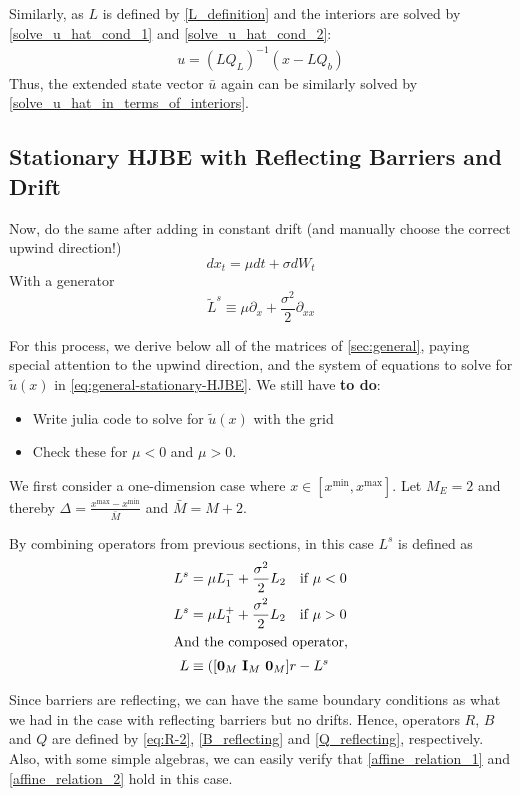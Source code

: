 \documentclass[11pt]{article}
\newcommand{\D}[1][]{\ensuremath{\partial_{#1}}}
\begin{document}
Similarly, as $L$ is defined by \cref{L_definition} and the interiors are solved by \cref{solve_u_hat_cond_1} and \cref{solve_u_hat_cond_2}:
\begin{align}
u = (L Q_L)^{-1}(x-L Q_b)
\end{align}
Thus, the extended state vector $\bar{u}$ again can be similarly solved by \cref{solve_u_hat_in_terms_of_interiors}.

\subsection{Stationary HJBE with Reflecting Barriers and Drift}
Now, do the same after adding in constant drift (and manually choose the correct upwind direction!)
$$
d x_t = \mu dt + \sigma d W_t
$$
With a generator
$$
	\tilde{L}^s \equiv \mu \D[x] + \frac{\sigma^2}{2}\D[xx]
$$

For this process, we derive below all of the matrices of \cref{sec:general}, paying special attention to the upwind direction, and the system of equations to solve for $\tilde{u}(x)$ in \cref{eq:general-stationary-HJBE}. We still have \textbf{to do}:
\begin{itemize}
	\item Write julia code to solve for $\tilde{u}(x)$ with the grid
	\item Check these for $\mu < 0$ and $\mu > 0$.
\end{itemize}

We first consider a one-dimension case where $x\in [x^{\min},x^{\max}]$. Let $M_E = 2$ and thereby $\Delta  = \frac{x^{\max}-x^{\min}}{\bar{M}}$ and $\bar{M} = M+2$.

By combining operators from previous sections, in this case $L^s$ is defined as
\begin{align}
L^s &= \mu L_1^{-} +\frac{\sigma^2}{2}L_2\quad\text{if }\mu<0\\
L^s &=\mu L_1^{+} +\frac{\sigma^2}{2}L_2\quad\text{if }\mu>0\\
\intertext{And the composed operator,}
	L &\equiv ([\mathbf{0}_{M} \text{ } \mathbf{I}_{M} \text{ } \mathbf{0}_{M}] r -  L^s
\end{align}

Since barriers are reflecting, we can have the same boundary conditions as what we had in the case with reflecting barriers but no drifts. Hence, operators $R$, $B$ and $Q$ are defined by \cref{eq:R-2}, \cref{B_reflecting} and \cref{Q_reflecting}, respectively. Also, with some simple algebras, we can easily verify that \cref{affine_relation_1} and \cref{affine_relation_2} hold in this case.
\end{document}
